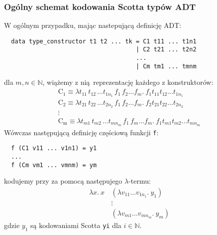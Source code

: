 \subsubsection{Ogólny schemat kodowania Scotta typów ADT}
W ogólnym przypadku, mając nastepującą definicję ADT:
\begin{verbatim}
  data type_constructor t1 t2 ... tk = C1 t11 ... t1n1
                                     | C2 t21 ... t2n2
                                     ...
                                     | Cm tm1 ... tmnm
\end{verbatim}
dla \(m, n \in \mathbb{N}\), wiążemy z nią reprezentację każdego z konstruktorów:
\begin{gather*}
  \mathrm{C_1} \equiv \lambda t_{11}\, t_{12}\, \dots t_{1n_1}\, f_1\, f_2 \dots f_m.\ f_1 t_{11} t_{12} \dots t_{1n_1}\\
  \mathrm{C_2} \equiv \lambda t_{21}\, t_{22}\, \dots t_{2n_2}\, f_1\, f_2 \dots f_m.\ f_2 t_{21} t_{22} \dots t_{2n_2}\\
 \vdots\\
  \mathrm{C_m} \equiv \lambda t_{m1}\, t_{m2}\, \dots t_{mn_m}\, f_1\, f_m \dots f_m.\ f_1 t_{m1} t_{m2} \dots t_{mn_m}
\end{gather*}
Wówczas następującą definicję częściową funkcji \texttt{f}:
\begin{verbatim}
  f (C1 v11 ... v1n1) = y1
  ...
  f (Cm vm1 ... vmnm) = ym
\end{verbatim}
kodujemy przy za pomocą następujego \(\lambda\)-termu:
\begin{align*}
  \lambda x.\ x\,&(\lambda v_{11}\dots v_{1n_1}.\ y_1)\\
                 &\vdots\\
                 &(\lambda v_{m1}\dots v_{mn_m}.\ y_m)
\end{align*}
gdzie \(y_1\) są kodowaniami Scotta \texttt{yi} dla \(i\in\mathbb{N}\). 

